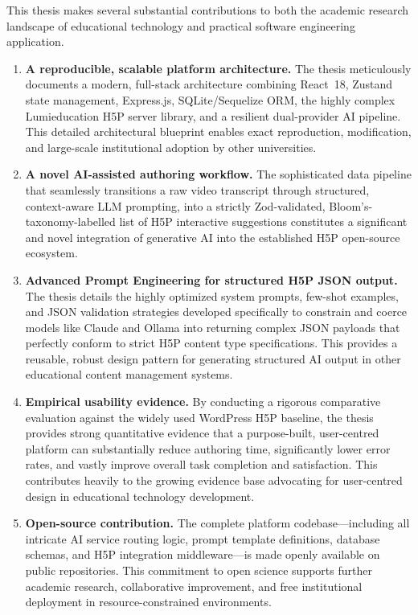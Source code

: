 This thesis makes several substantial contributions to both the academic research landscape of educational technology and practical software engineering application.

\begin{enumerate}
  \item \textbf{A reproducible, scalable platform architecture.} The thesis meticulously documents a modern, full-stack architecture combining React~18, Zustand state management, Express.js, SQLite/Sequelize ORM, the highly complex Lumieducation H5P server library, and a resilient dual-provider AI pipeline. This detailed architectural blueprint enables exact reproduction, modification, and large-scale institutional adoption by other universities.
  \item \textbf{A novel AI-assisted authoring workflow.} The sophisticated data pipeline that seamlessly transitions a raw video transcript through structured, context-aware LLM prompting, into a strictly Zod-validated, Bloom's-taxonomy-labelled list of H5P interactive suggestions constitutes a significant and novel integration of generative AI into the established H5P open-source ecosystem.
  \item \textbf{Advanced Prompt Engineering for structured H5P JSON output.} The thesis details the highly optimized system prompts, few-shot examples, and JSON validation strategies developed specifically to constrain and coerce models like Claude and Ollama into returning complex JSON payloads that perfectly conform to strict H5P content type specifications. This provides a reusable, robust design pattern for generating structured AI output in other educational content management systems.
  \item \textbf{Empirical usability evidence.} By conducting a rigorous comparative evaluation against the widely used WordPress H5P baseline, the thesis provides strong quantitative evidence that a purpose-built, user-centred platform can substantially reduce authoring time, significantly lower error rates, and vastly improve overall task completion and satisfaction. This contributes heavily to the growing evidence base advocating for user-centred design in educational technology development.
  \item \textbf{Open-source contribution.} The complete platform codebase—including all intricate AI service routing logic, prompt template definitions, database schemas, and H5P integration middleware—is made openly available on public repositories. This commitment to open science supports further academic research, collaborative improvement, and free institutional deployment in resource-constrained environments.
\end{enumerate}


